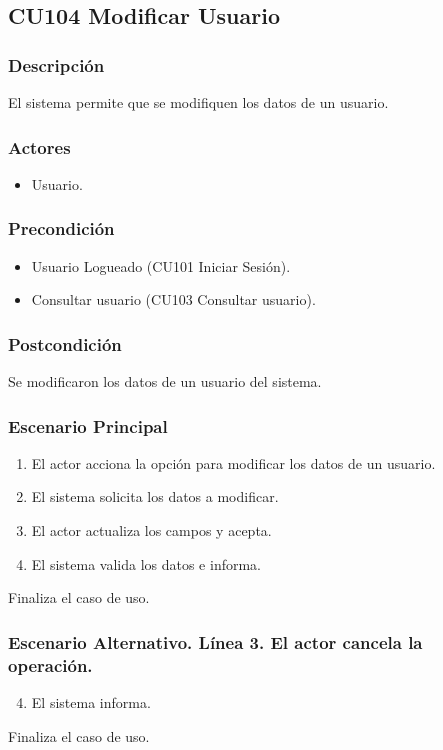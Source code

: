 \subsection{CU104 Modificar Usuario}
\subsubsection{Descripci\'{o}n}
El sistema permite que se modifiquen los datos de un usuario.
\subsubsection{Actores}
\begin{itemize}
\item Usuario.
\end{itemize}
\subsubsection{Precondici\'{o}n}
\begin{itemize}
\item Usuario Logueado (CU101 Iniciar Sesi\'{o}n).
\item Consultar usuario (CU103 Consultar usuario).
\end{itemize}
\subsubsection{Postcondici\'{o}n}
Se modificaron los datos de un usuario del sistema.
\subsubsection{Escenario Principal}
\begin{enumerate}
\item El actor acciona la opci\'{o}n para modificar los datos de un usuario.
\item El sistema solicita los datos a modificar.
\item El actor actualiza los campos y acepta.
\item El sistema valida los datos e informa.
\end{enumerate}
Finaliza el caso de uso.
\subsubsection{Escenario Alternativo. L\'{i}nea 3. El actor cancela la operaci\'{o}n.}
\begin{enumerate}
\setcounter{enumi}{3}
\item El sistema informa.
\end{enumerate}
Finaliza el caso de uso.

